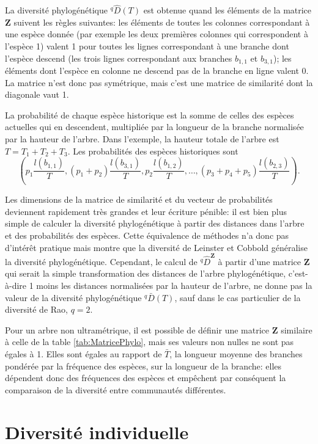 \documentclass[
  11pt,
  french,
  a4paper,
  extrafontsizes,onecolumn,openright
  ]{memoir}
\begin{document}
La diversité phylogénétique \(^{q}\!\hat{D}(T)\) est obtenue quand les éléments de la matrice \(\mathbf{Z}\) suivent les règles suivantes: les éléments de toutes les colonnes correspondant à une espèce donnée (par exemple les deux premières colonnes qui correspondent à l'espèce 1) valent 1 pour toutes les lignes correspondant à une branche dont l'espèce descend (les trois lignes correspondant aux branches \(b_{1,1}\) et \(b_{3,1}\)); les éléments dont l'espèce en colonne ne descend pas de la branche en ligne valent 0.
La matrice n'est donc pas symétrique, mais c'est une matrice de similarité dont la diagonale vaut 1.

La probabilité de chaque espèce historique est la somme de celles des espèces actuelles qui en descendent, multipliée par la longueur de la branche normalisée par la hauteur de l'arbre.
Dans l'exemple, la hauteur totale de l'arbre est \(T=T_1 + T_2 + T_3\).
Les probabilités des espèces historiques sont
\[(p_1 \frac{l(b_{1,1})}{T}, (p_1 + p_2) \frac{l(b_{3,1})}{T}, p_2 \frac{l(b_{1,2})}{T}, \dots, (p_3 + p_4 + p_5) \frac{l(b_{2,3})}{T}).\]

Les dimensions de la matrice de similarité et du vecteur de probabilités deviennent rapidement très grandes et leur écriture pénible: il est bien plus simple de calculer la diversité phylogénétique à partir des distances dans l'arbre et des probabilités des espèces.
Cette équivalence de méthodes n'a donc pas d'intérêt pratique mais montre que la diversité de Leinster et Cobbold généralise la diversité phylogénétique.
Cependant, le calcul de \(^q\!{\hat{D}}^{\mathbf{Z}}\) à partir d'une matrice \(\mathbf{Z}\) qui serait la simple transformation des distances de l'arbre phylogénétique, c'est-à-dire 1 moins les distances normalisées par la hauteur de l'arbre, ne donne pas la valeur de la diversité phylogénétique \(^{q}\!\bar{D}(T)\), sauf dans le cas particulier de la diversité de Rao, \(q=2\).

Pour un arbre non ultramétrique, il est possible de définir une matrice \(\mathbf{Z}\) similaire à celle de la table \ref{tab:MatricePhylo}, mais ses valeurs non nulles ne sont pas égales à 1.
Elles sont égales au rapport de \(\bar{T}\), la longueur moyenne des branches pondérée par la fréquence des espèces, sur la longueur de la branche: elles dépendent donc des fréquences des espèces et empêchent par conséquent la comparaison de la diversité entre communautés différentes.

\hypertarget{diversituxe9-individuelle-1}{%
\section{Diversité individuelle}\label{diversituxe9-individuelle-1}}
\end{document}
